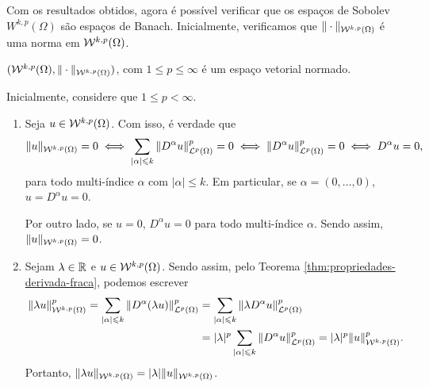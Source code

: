 Com os resultados obtidos, agora é possível verificar que os espaços de Sobolev $W^{k,p}(\Omega)$ são espaços de Banach. Inicialmente, verificamos que $\Vert \cdot \Vert_{\mathcal{W}^{k,p}(\Omega)}$ é uma norma em $\mathcal{W}^{k,p}(\Omega)$.

\begin{tbox}
    $(\mathcal{W}^{k,p}(\Omega), \Vert \cdot \Vert_{\mathcal{W}^{k,p}(\Omega)})$, com $1 \leqslant p \leqslant \infty$ é um espaço vetorial normado.
\end{tbox}
\begin{prf}
    Inicialmente, considere que $1 \leqslant p < \infty$.
    \begin{enumerate}[leftmargin=*]
        \item Seja $u \in \mathcal{W}^{k,p}(\Omega)$. Com isso, é verdade que
        \[
            \Vert u \Vert_{\mathcal{W}^{k,p}(\Omega)} = 0 \iff \sum_{|\alpha| \leqslant k} \Vert D^\alpha u \Vert_{\mathcal{L}^p(\Omega)}^p = 0 \iff \Vert D^\alpha u \Vert_{\mathcal{L}^p(\Omega)}^p = 0 \iff D^\alpha u = 0,
        \]
        para todo multi-índice $\alpha$ com $|\alpha| \leqslant k$.
        Em particular, se $\alpha = (0,\dots,0)$, $u = D^\alpha u = 0$.

        Por outro lado, se $u = 0$, $D^\alpha u = 0$ para todo multi-índice $\alpha$. Sendo assim, $\Vert u \Vert_{\mathcal{W}^{k,p}(\Omega)} = 0$.

        \item Sejam $\lambda \in \mathbb{R}$ e $u \in \mathcal{W}^{k,p}(\Omega)$. Sendo assim, pelo Teorema \ref{thm:propriedades-derivada-fraca}, podemos escrever
        \[
            \begin{aligned}
                \Vert \lambda u \Vert_{\mathcal{W}^{k,p}(\Omega)}^p = \sum_{|\alpha| \leqslant k} \Vert D^\alpha (\lambda u) \Vert_{\mathcal{L}^p(\Omega)}^p &= \sum_{|\alpha| \leqslant k} \Vert \lambda D^\alpha u \Vert_{\mathcal{L}^p(\Omega)}^p\\ 
                &= |\lambda|^p\sum_{|\alpha| \leqslant k} \Vert D^\alpha u \Vert_{\mathcal{L}^p(\Omega)}^p = |\lambda|^p\Vert u \Vert_{\mathcal{W}^{k,p}(\Omega)}^p.
            \end{aligned}
        \]
        Portanto, $\Vert \lambda u \Vert_{\mathcal{W}^{k,p}(\Omega)} = |\lambda|\Vert u \Vert_{\mathcal{W}^{k,p}(\Omega)}$.


\end{enumerate}
\end{prf}
